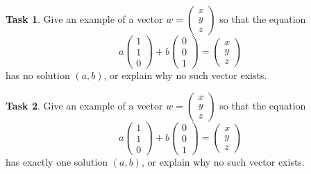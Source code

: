 \documentclass[10pt,]{book}
\theoremstyle{plain}
\theoremstyle{definition}
\numberwithin{equation}{section}
\newtheorem{task}{Task}[chapter]
\begin{document}
\begin{task}
\label{task-8}
Give an example of a vector \(w = \begin{pmatrix} x \\ y \\
                  z \end{pmatrix}\) so that the equation \[a \begin{pmatrix}
                  1 \\ 1 \\ 0 \end{pmatrix} + b \begin{pmatrix} 0 \\ 0 \\ 1
                  \end{pmatrix} = \begin{pmatrix} x \\ y \\ z \end{pmatrix}\]
                  has no solution \((a,b)\), or explain why no such vector
                  exists.%
\end{task}
\begin{task}
\label{task-9}
Give an example of a vector \(w = \begin{pmatrix} x \\ y \\ z
                  \end{pmatrix}\) so that the equation \[ a \begin{pmatrix}
                  1 \\ 1 \\ 0 \end{pmatrix} + b \begin{pmatrix} 0 \\ 0 \\ 1
                  \end{pmatrix} = \begin{pmatrix} x \\ y \\ z \end{pmatrix}\]
                  has exactly one solution \((a,b)\), or explain why no such
                  vector exists.%
\end{task}
\end{document}
